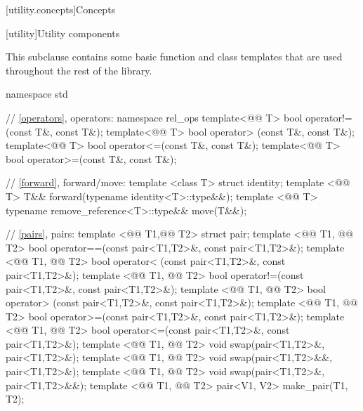 \documentclass[american,twoside]{book}
\begin{document}
[utility.concepts]{Concepts}


[utility]{Utility components}

\pnum
This subclause contains some basic function and class templates that are used
throughout the rest of the library.

%
%

\begin{codeblock}
namespace std {
  // \ref{operators}, operators:
  namespace rel_ops {
    template<@@ T> bool operator!=(const T&, const T&);
    template<@@ T> bool operator> (const T&, const T&);
    template<@@ T> bool operator<=(const T&, const T&);
    template<@@ T> bool operator>=(const T&, const T&);
  }

  // \ref{forward}, forward/move:
  template <class T> struct identity;
  template <@@ T> T&& forward(typename identity<T>::type&&);
  template <@@ T> typename remove_reference<T>::type&& move(T&&);

  // \ref{pairs}, pairs:
  template <@@ T1,@@ T2> struct pair;
  template <@@ T1, @@ T2>
    bool operator==(const pair<T1,T2>&, const pair<T1,T2>&);
  template <@@ T1, @@ T2>
    bool operator< (const pair<T1,T2>&, const pair<T1,T2>&);
  template <@@ T1, @@ T2>
    bool operator!=(const pair<T1,T2>&, const pair<T1,T2>&);
  template <@@ T1, @@ T2>
    bool operator> (const pair<T1,T2>&, const pair<T1,T2>&);
  template <@@ T1, @@ T2>
    bool operator>=(const pair<T1,T2>&, const pair<T1,T2>&);
  template <@@ T1, @@ T2>
    bool operator<=(const pair<T1,T2>&, const pair<T1,T2>&);
  template <@@ T1, @@ T2> 
    void swap(pair<T1,T2>&, pair<T1,T2>&); 
  template <@@ T1, @@ T2> 
    void swap(pair<T1,T2>&&, pair<T1,T2>&);
  template <@@ T1, @@ T2> 
    void swap(pair<T1,T2>&, pair<T1,T2>&&); 
  template <@@ T1,
  @@ T2> pair<V1, V2> make_pair(T1, T2);

}
\end{codeblock}
\end{document}
